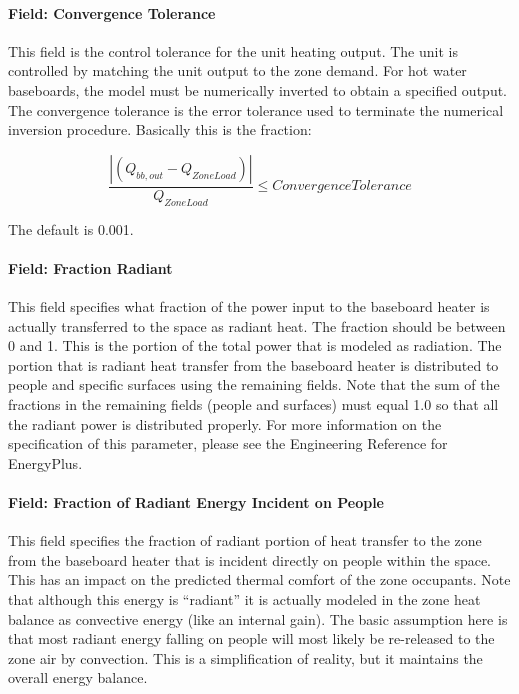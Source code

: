 \paragraph{Field: Convergence Tolerance}\label{field-convergence-tolerance-000}

This field is the control tolerance for the unit heating output. The unit is controlled by matching the unit output to the zone demand. For hot water baseboards, the model must be numerically inverted to obtain a specified output. The convergence tolerance is the error tolerance used to terminate the numerical inversion procedure. Basically this is the fraction:

\begin{equation}
\frac{{\left| {({Q_{bb,out}} - {Q_{ZoneLoad}})} \right|}}{{{Q_{ZoneLoad}}}} \le Convergence Tolerance
\end{equation}

The default is 0.001.

\paragraph{Field: Fraction Radiant}\label{field-fraction-radiant-000}

This field specifies what fraction of the power input to the baseboard heater is actually transferred to the space as radiant heat. The fraction should be between 0 and 1. This is the portion of the total power that is modeled as radiation. The portion that is radiant heat transfer from the baseboard heater is distributed to people and specific surfaces using the remaining fields. Note that the sum of the fractions in the remaining fields (people and surfaces) must equal 1.0 so that all the radiant power is distributed properly. For more information on the specification of this parameter, please see the Engineering Reference for EnergyPlus.

\paragraph{Field: Fraction of Radiant Energy Incident on People}\label{field-fraction-of-radiant-energy-incident-on-people}

This field specifies the fraction of radiant portion of heat transfer to the zone from the baseboard heater that is incident directly on people within the space. This has an impact on the predicted thermal comfort of the zone occupants. Note that although this energy is ``radiant'' it is actually modeled in the zone heat balance as convective energy (like an internal gain). The basic assumption here is that most radiant energy falling on people will most likely be re-released to the zone air by convection. This is a simplification of reality, but it maintains the overall energy balance.

